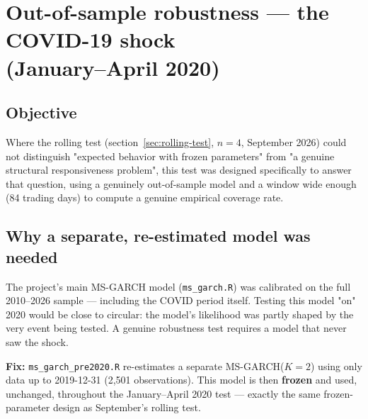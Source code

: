 \documentclass[12pt,a4paper]{article}
\begin{document}
\section{Out-of-sample robustness --- the COVID-19 shock \\(January--April 2020)}
\label{sec:covid}

\subsection{Objective}
Where the rolling test (section~\ref{sec:rolling-test}, $n=4$,
September 2026) could not distinguish "expected
behavior with frozen parameters" from "a genuine structural
responsiveness problem", this test was designed specifically to
answer that question, using a genuinely out-of-sample model
and a window wide enough (84 trading days) to compute a
genuine empirical coverage rate.

\subsection{Why a separate, re-estimated model was needed}

The project's main MS-GARCH model (\texttt{ms\_garch.R}) was
calibrated on the full 2010--2026 sample --- including the
COVID period itself. Testing this model "on" 2020 would be
close to circular: the model's likelihood was partly shaped by
the very event being tested. A genuine robustness test requires a
model that never saw the shock.

\textbf{Fix:} \texttt{ms\_garch\_pre2020.R} re-estimates a
separate MS-GARCH($K=2$) using only data up to
2019-12-31 (2,501 observations). This model is then
\textbf{frozen} and used, unchanged, throughout the
January--April 2020 test --- exactly the same frozen-parameter
design as September's rolling test.

\vspace{0.3cm}
\end{document}
